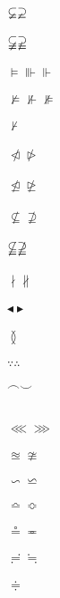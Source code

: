 \documentclass{article}
\begin{document}
$\varsubsetneq \varsupsetneq$\\\\       
$\varsubsetneqq \varsupsetneqq$\\\\
$\vDash \Vvdash \Vdash$\\\\
$\nvDash \nVdash \nVDash$\\\\
$\nvdash$\\\\
$\ntriangleleft \ntriangleright$\\\\
$\ntrianglelefteq \ntrianglerighteq$\\\\
$\nsubseteq \nsupseteq$\\\\
$\nsubseteqq \nsupseteqq$\\\\
$\nmid \nparallel$\\\\
$\blacktriangleleft \blacktriangleright$\\\\
$\between$\\\\
$\because \therefore$\\\\
$\smallfrown \smallsmile$\\\\
\\
$\lll \ggg$\\\\
$\approxeq \ncong $\\\\
$\backsim \backsimeq$\\\\
$\bumpeq \Bumpeq $\\\\
$\circeq \eqcirc $\\\\
$\risingdotseq \fallingdotseq $\\\\
$\doteqdot $\\\\
\end{document}
